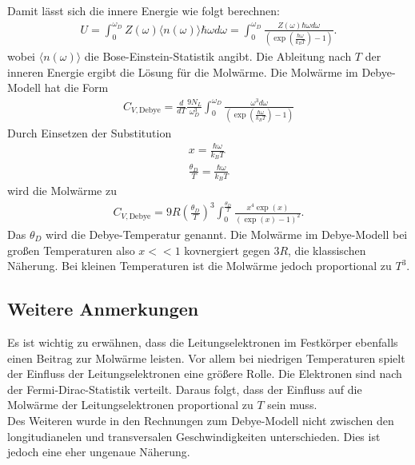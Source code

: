 Damit lässt sich die innere Energie wie folgt berechnen:
\begin{align*}
    U =  \int_0^{\omega_D} Z(\omega) \langle n(\omega)\rangle \hbar \omega d \omega=  \int_0^{\omega_D} \frac{Z(\omega) \hbar \omega d \omega}{\left(\exp \left(\frac{\hbar \omega}{k_B T}\right) -1 \right)}.
\end{align*}
wobei $\langle n(\omega)\rangle$ die Bose-Einstein-Statistik angibt. Die Ableitung nach $T$ der inneren Energie ergibt die Lösung für die Molwärme. Die Molwärme im Debye-Modell hat die Form
\begin{align*}
    C_{V,\text{Debye}}= \frac{d}{d T}\frac{9 N_L}{\omega_D^3} \int_0^{\omega_D} \frac{\omega^3 d\omega}{\left(\exp \left(\frac{\hbar \omega}{k_B T}\right) -1 \right)}
\end{align*}
Durch Einsetzen der Substitution 
\begin{align*}
    x = \frac{\hbar \omega}{k_B T} \\  \frac{\theta_D}{T} = \frac{\hbar \omega}{ k_B T}
\end{align*}
wird die Molwärme zu
\begin{align*}
    C_{V,\text{Debye}} = 9 R \left(\frac{\theta_D}{T}\right)^3 \int_0^{\frac{\theta_D}{T}} \frac{x^4 \exp \left(x\right)}{ \left(\exp(x) -1\right)^2}.
\end{align*}
Das $\theta_D$ wird die Debye-Temperatur genannt. Die Molwärme im Debye-Modell bei großen Temperaturen also $x<<1$ kovnergiert gegen $3 R$, die klassischen Näherung. Bei kleinen Temperaturen ist die Molwärme 
jedoch proportional zu $T^3$. 
\subsection{Weitere Anmerkungen}
Es ist wichtig zu erwähnen, dass die Leitungselektronen im Festkörper ebenfalls einen Beitrag zur Molwärme leisten. Vor allem bei niedrigen Temperaturen spielt der Einfluss der Leitungselektronen eine größere Rolle. 
Die Elektronen sind nach der Fermi-Dirac-Statistik verteilt. Daraus folgt, dass der Einfluss auf die Molwärme der Leitungselektronen proportional zu $T$ sein muss. \\
Des Weiteren wurde in den Rechnungen zum Debye-Modell nicht zwischen den longitudianelen und transversalen Geschwindigkeiten unterschieden. Dies ist jedoch eine eher ungenaue Näherung.